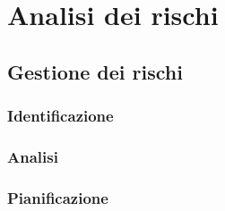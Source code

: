 \section{Analisi dei rischi}
	\subsection{Gestione dei rischi}
		\subsubsection{Identificazione}
		\subsubsection{Analisi}
		\subsubsection{Pianificazione}